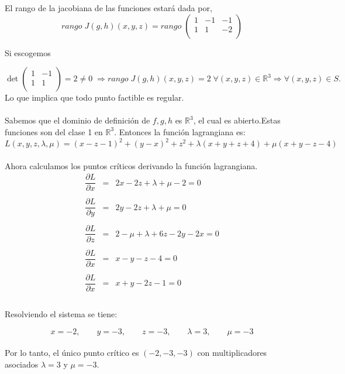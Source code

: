 \begin{enumerate}
\begin{enumerate}[\bfseries a)]
		El rango de la jacobiana de las funciones estará dada por,
		$$rango\; J(g,h)(x,y,z)=rango\;\begin{pmatrix}
		    1&-1&-1\\
		    1&1&-2\\
		\end{pmatrix}$$

		Si escogemos 

		$$\det \begin{pmatrix}
		    1&-1\\
		     1&1\\
		 \end{pmatrix} = 2 \neq 0\; \Longrightarrow rango\; J(g,h)(x,y,z)=2\; \forall(x,y,z)\in \mathbb{R}^3 \Longrightarrow \forall(x,y,z)\in S.$$
		  Lo que implica que todo punto factible es regular.\\\\

		Sabemos que el dominio de definición de $f,g,h$ es $\mathbb{R}^3$, el cual es abierto.Estas funciones son del clase 1 en $\mathbb{R}^3$. Entonces la función lagrangiana es:\\
		$$L(x,y,z,\lambda,\mu) = (x-z-1)^2+(y-x)^2 + z^2 + \lambda(x+y+z+4)+\mu(x+y-z-4)$$\\
		
		Ahora calculamos los puntos críticos derivando la función lagrangiana.\\

		$$\begin{array}{rcl}
		    \dfrac{\partial L}{\partial x}&=&2x-2z+\lambda + \mu -2 = 0\\\\
		    \dfrac{\partial L}{\partial y}&=&2y-2z+\lambda + \mu = 0\\\\
		    \dfrac{\partial L}{\partial z}&=&2-\mu + \lambda +6z-2y-2x=0\\\\
		    \dfrac{\partial L}{\partial x}&=&x-y-z-4=0\\\\
		    \dfrac{\partial L}{\partial x}&=&x+y-2z-1=0\\\\
		\end{array}$$

		Resolviendo el sistema se tiene:

		$$x=-2,\qquad y=-3,\qquad z=-3,\qquad \lambda=3,\qquad \mu = -3$$\\

		Por lo tanto, el único punto crítico es $\left(-2,-3,-3\right)$ con multiplicadores asociados $\lambda=3$ y $\mu=-3$.\\\\


\end{enumerate}
\end{enumerate}
